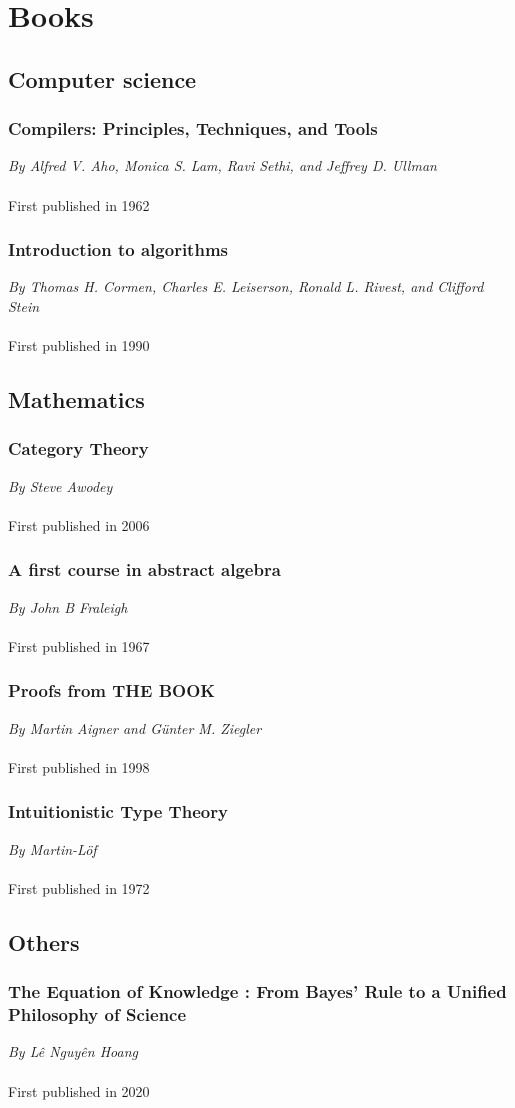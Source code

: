 \documentclass{article}
\begin{document}
    \section{Books}

\subsection{Computer science}
\subsubsection{Compilers: Principles, Techniques, and Tools}
\textit{By Alfred V. Aho, Monica S. Lam, Ravi Sethi, and Jeffrey D. Ullman}\\\\
First published in 1962
\subsubsection{Introduction to algorithms}
\textit{By Thomas H. Cormen, Charles E. Leiserson, Ronald L. Rivest, and Clifford Stein}\\\\
First published in 1990
\subsection{Mathematics}
\subsubsection{Category Theory}
\textit{By Steve Awodey}\\\\
First published in 2006
\subsubsection{A first course in abstract algebra}
\textit{By John B Fraleigh}\\\\
First published in 1967
\subsubsection{Proofs from THE BOOK}
\textit{By Martin Aigner and Günter M. Ziegler}\\\\
First published in 1998
\subsubsection{Intuitionistic Type Theory}
\textit{By Martin-Löf}\\\\
First published in 1972
\subsection{Others}
\subsubsection{The Equation of Knowledge : From Bayes' Rule to a Unified Philosophy of Science}
\textit{By Lê Nguyên Hoang}\\\\
First published in 2020
\end{document}
